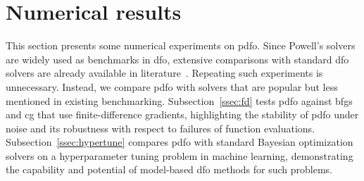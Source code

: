 \documentclass[
    smallextended,  %
    final,        %
]{svjour3}
\newcommand{\rad}[1][k]{\Delta\ifthenelse{\equal{#1}{}}{}{_{#1}}}
\begin{document}


\section{Numerical results}
\label{sec:numerical}

This section presents some numerical experiments on \gls{pdfo}.
Since Powell's solvers are widely used as benchmarks in \gls{dfo},
extensive comparisons with standard \gls{dfo} solvers are
already available in literature~\cite{More_Wild_2009,Rios_Sahinidis_2013}.
Repeating such experiments is unnecessary. Instead, we compare \gls{pdfo} with solvers that
are popular but less mentioned in existing benchmarking.
Subsection~\ref{ssec:fd} tests \gls{pdfo} against \gls{bfgs} and \gls{cg} that use finite-difference gradients,
highlighting the stability of \gls{pdfo} under noise and its robustness with respect to failures of
function evaluations.
Subsection~\ref{ssec:hypertune} compares \gls{pdfo} with standard Bayesian optimization solvers
on a hyperparameter tuning problem in machine learning, demonstrating the capability and potential
of model-based \gls{dfo} methods for such problems.
\end{document}
